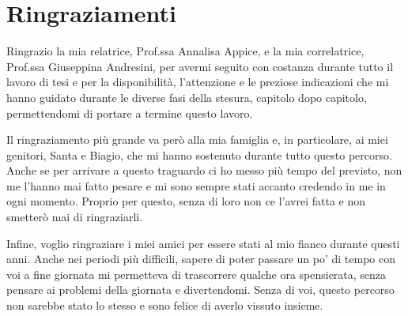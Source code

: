 \chapter*{Ringraziamenti}

Ringrazio la mia relatrice, Prof.ssa Annalisa Appice, e la mia correlatrice, Prof.ssa Giuseppina Andresini, 
per avermi seguito con costanza durante tutto il lavoro di tesi e per la disponibilità, l'attenzione e le 
preziose indicazioni che mi hanno guidato durante le diverse fasi della stesura, capitolo dopo capitolo, 
permettendomi di portare a termine questo lavoro.

Il ringraziamento più grande va però alla mia famiglia e, in particolare, ai miei genitori, Santa e Biagio, che 
mi hanno sostenuto durante tutto questo percorso. Anche se per arrivare a questo traguardo ci ho messo più 
tempo del previsto, non me l'hanno mai fatto pesare e mi sono sempre stati accanto credendo in me in ogni momento.
Proprio per questo, senza di loro non ce l'avrei fatta e non smetterò mai di ringraziarli.

Infine, voglio ringraziare i miei amici per essere stati al mio fianco durante questi anni. Anche nei periodi
più difficili, sapere di poter passare un po' di tempo con voi a fine giornata mi permetteva di trascorrere qualche
ora spensierata, senza pensare ai problemi della giornata e divertendomi. Senza di voi, questo percorso
non sarebbe stato lo stesso e sono felice di averlo vissuto insieme.